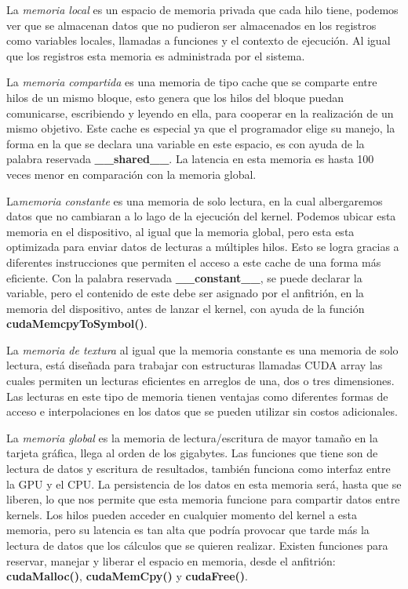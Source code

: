 La \textit{memoria local} es un espacio de memoria privada que cada hilo tiene, podemos ver que se almacenan datos que no pudieron ser almacenados en los registros como variables locales, llamadas a funciones y el contexto de ejecución. Al igual que los registros esta memoria es administrada por el sistema.

La \textit{memoria compartida} es una memoria de tipo cache que se comparte entre hilos de un mismo bloque, esto genera que los hilos del bloque puedan comunicarse, escribiendo y leyendo en ella, para cooperar en la realización de un mismo objetivo. Este cache es especial ya que el programador elige su manejo, la forma en la que se declara una variable en este espacio, es con ayuda de la palabra reservada \textbf{\_\_shared\_\_}. La latencia en esta memoria es hasta 100 veces menor en comparación con la memoria global. 

La\textit{memoria constante} es una memoria de solo lectura, en la cual albergaremos datos que no cambiaran a lo lago de la ejecución del kernel. Podemos ubicar esta memoria en el dispositivo, al igual que la memoria global, pero esta esta optimizada para enviar datos de lecturas a múltiples hilos. Esto se logra gracias a diferentes instrucciones  que permiten el acceso a este cache de una forma más eficiente. Con la palabra reservada \textbf{\_\_constant\_\_}, se puede declarar la variable, pero el contenido de este debe ser asignado por el anfitrión, en la memoria del dispositivo, antes de lanzar el kernel, con ayuda de la función \textbf{cudaMemcpyToSymbol()}.

La \textit{memoria de textura} al igual que la memoria constante es una memoria de solo lectura, está diseñada para trabajar con estructuras llamadas CUDA array las cuales permiten un lecturas eficientes en arreglos de una, dos o tres dimensiones. Las lecturas en este tipo de memoria tienen ventajas como diferentes formas de acceso e interpolaciones en los datos que se pueden utilizar sin costos adicionales.




La \textit{memoria global} es la memoria de lectura/escritura de mayor tamaño en la tarjeta gráfica, llega al orden de los gigabytes. Las funciones que tiene son de lectura de datos y escritura de resultados, también funciona como interfaz entre la GPU y el CPU. La persistencia de los datos en esta memoria será, hasta que se liberen, lo que nos permite que esta memoria funcione para compartir datos entre kernels. Los hilos pueden acceder en cualquier momento del kernel a esta memoria, pero su latencia es tan alta que podría provocar que tarde más la lectura de datos que los cálculos que se quieren realizar. Existen funciones para reservar, manejar y liberar el espacio en memoria, desde el anfitrión: \textbf{cudaMalloc()}, \textbf{cudaMemCpy()} y \textbf{cudaFree()}.



